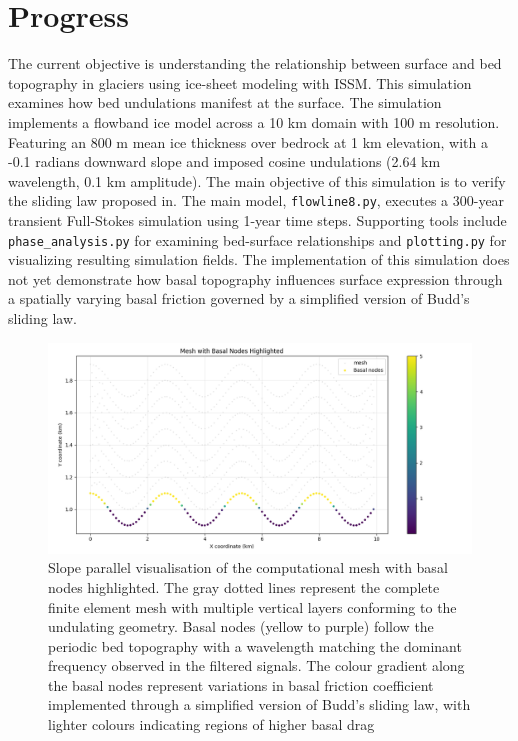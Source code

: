 \chapter{Progress}

The current objective is understanding the relationship between surface and bed topography in glaciers using ice-sheet modeling with ISSM. This simulation examines how bed undulations manifest at the surface. The simulation implements a flowband ice model across a 10 km domain with 100 m resolution. Featuring an 800 m mean ice thickness over bedrock at 1 km elevation, with a -0.1 radians downward slope and imposed cosine undulations (2.64 km wavelength, 0.1 km amplitude). The main objective of this simulation is to verify the sliding law proposed in\cite{Budd_1970}. The main model, \texttt{flowline8.py}, executes a 300-year transient Full-Stokes simulation using 1-year time steps. Supporting tools include \texttt{phase\_analysis.py} for examining bed-surface relationships and \texttt{plotting.py} for visualizing resulting simulation fields. The implementation of this simulation does not yet demonstrate how basal topography influences surface expression through a spatially varying basal friction governed by a simplified version of Budd's sliding law.

\begin{figure}[H]
    \includegraphics[scale=0.5]{basal_friction.png}
    \caption{Slope parallel visualisation of the computational mesh with basal nodes highlighted. The gray dotted lines represent the complete finite element mesh with multiple vertical layers conforming to the undulating geometry. Basal nodes (yellow to purple) follow the periodic bed topography with a wavelength matching the dominant frequency observed in the filtered signals. The colour gradient along the basal nodes represent variations in basal friction coefficient implemented through a simplified version of Budd's sliding law, with lighter colours indicating regions of higher basal drag}
    \label{fig:Friction}
\end{figure}

